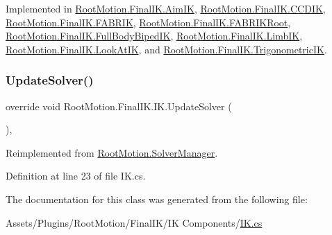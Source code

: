 Implemented in \mbox{\hyperlink{class_root_motion_1_1_final_i_k_1_1_aim_i_k_afdd0f041a17867eb9ea3bdfcabf273c7}{Root\+Motion.\+Final\+I\+K.\+Aim\+IK}}, \mbox{\hyperlink{class_root_motion_1_1_final_i_k_1_1_c_c_d_i_k_a338aeec4a93d1b623f9a20a9e03b9677}{Root\+Motion.\+Final\+I\+K.\+C\+C\+D\+IK}}, \mbox{\hyperlink{class_root_motion_1_1_final_i_k_1_1_f_a_b_r_i_k_a05b2d0586050c16146e02cde8a0e1b11}{Root\+Motion.\+Final\+I\+K.\+F\+A\+B\+R\+IK}}, \mbox{\hyperlink{class_root_motion_1_1_final_i_k_1_1_f_a_b_r_i_k_root_a1603e05ce4253accd82d0aee081cc115}{Root\+Motion.\+Final\+I\+K.\+F\+A\+B\+R\+I\+K\+Root}}, \mbox{\hyperlink{class_root_motion_1_1_final_i_k_1_1_full_body_biped_i_k_a18f11840a747ff0163ba5933b026badc}{Root\+Motion.\+Final\+I\+K.\+Full\+Body\+Biped\+IK}}, \mbox{\hyperlink{class_root_motion_1_1_final_i_k_1_1_limb_i_k_a3f518043b978d7a162c7390b5b7c8ca3}{Root\+Motion.\+Final\+I\+K.\+Limb\+IK}}, \mbox{\hyperlink{class_root_motion_1_1_final_i_k_1_1_look_at_i_k_abdc32a69392d71c9ce0f1c68778251a5}{Root\+Motion.\+Final\+I\+K.\+Look\+At\+IK}}, and \mbox{\hyperlink{class_root_motion_1_1_final_i_k_1_1_trigonometric_i_k_a67d1ec2da507e10b46c7446099e49859}{Root\+Motion.\+Final\+I\+K.\+Trigonometric\+IK}}.

\mbox{\label{class_root_motion_1_1_final_i_k_1_1_i_k_adec5648de6e1fc9fcbc2de325fc654a2}} 
\subsubsection{\texorpdfstring{Update\+Solver()}{UpdateSolver()}}
{\footnotesize\ttfamily override void Root\+Motion.\+Final\+I\+K.\+I\+K.\+Update\+Solver (\begin{DoxyParamCaption}{ }\end{DoxyParamCaption})\hspace{0.3cm}{\ttfamily [protected]}, {\ttfamily [virtual]}}



Reimplemented from \mbox{\hyperlink{class_root_motion_1_1_solver_manager_ac7a8239a700672570da89d88544a340d}{Root\+Motion.\+Solver\+Manager}}.



Definition at line 23 of file I\+K.\+cs.



The documentation for this class was generated from the following file\+:\begin{DoxyCompactItemize}
\item 
Assets/\+Plugins/\+Root\+Motion/\+Final\+I\+K/\+I\+K Components/\mbox{\hyperlink{_i_k_8cs}{I\+K.\+cs}}\end{DoxyCompactItemize}
